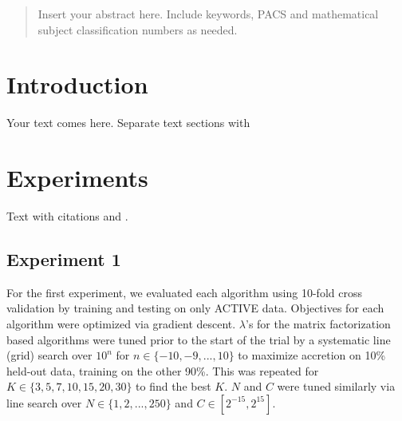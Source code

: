 
\date{Received: date / Accepted: date}


\maketitle

\begin{abstract}
Insert your abstract here. Include keywords, PACS and mathematical
subject classification numbers as needed.
\end{abstract}

\section{Introduction}
\label{intro}
Your text comes here. Separate text sections with

\section{Experiments}
\label{sec:1}
Text with citations \cite{RefB} and \cite{RefJ}.

\subsection{Experiment 1}
\label{sec:2}



For the first experiment, we evaluated each algorithm using 10-fold cross validation by training and testing on only ACTIVE data. Objectives for each algorithm were optimized via gradient descent.
$\lambda$'s for the matrix factorization based algorithms were tuned prior to the start of the trial by a systematic line (grid) search over $10^n$ for $n \in \{-10, -9, ..., 10\}$ to maximize 
accretion on 10\% held-out data, training on the other 90\%. This was repeated for $K \in \{3, 5, 7, 10, 15, 20, 30\}$ to find the best $K$. $N$ and $C$ were tuned similarly via line search 
over $N \in \{1, 2,..., 250\}$ and $C \in [2^{-15}, 2^{15}]$.


